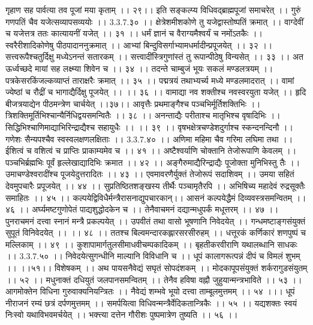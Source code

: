 गृहाण सह पार्वत्या तव पूजां मया कृताम् ।। २९।।
इति सङ्कल्प्य विधिवद्ब्राह्मपूजां समाचरेत् ।।
गुरुं गणपतिं चैव यजेत्सव्यापसव्ययोः ।। 3.3.7.३० ।।
क्षेत्रेशमीशकोणे तु यजेद्वास्तोष्पतिं क्रमात् ।।
वाग्देवीं च यजेत्तत्र ततः कात्यायनीं यजेत् ।। ३१ ।।
धर्मं ज्ञानं च वैराग्यमैश्वर्यं च नमोंऽतकैः ।।
स्वरैरीशादिकोणेषु पीठपादाननुक्रमात् ।।
आभ्यां बिन्दुविसर्गाभ्यामधर्मादीन्प्रपूजयेत् ।। ३२ ।।
सत्त्वरूपैश्चतुर्दिक्षु मध्येऽनन्तं सतारकम् ।।
सत्त्वादींस्त्रिगुणांस्तं तु रूपान्पीठेषु विन्यसेत् ।। ३३ ।।
अत ऊर्ध्वच्छदे मायां सह लक्ष्म्या शिवेन च ।। ३४ ।।
तदन्ते चाम्बुजं भूयः सकलं मण्डलत्रयम् ।।
पत्रकेसरकिंजल्कव्याप्तं ताराक्षरैः क्रमात् ।। ३५ ।।
पद्मत्रयं तथाभ्यर्च्य मध्ये मण्डलमादरात् ।।
वामां ज्येष्ठां च रौद्रीं च भागाद्यैर्दिक्षु पूजयेत् ।। ।। ३६ ।।
वामाद्या नव शक्तीश्च नवस्वरयुता यजेत् ।।
हृदि बीजत्रयाद्येन पीठमन्त्रेण चार्चयेत् ।।३७।।
आवृत्तैः प्रथमाङ्गैश्च पञ्चभिर्मूर्तिशक्तिभिः ।।
त्रिशक्तिमूर्तिभिश्चान्यैर्निधिद्वयसमन्वितैः ।। ३८ ।।
अनन्ताद्यैः परीताश्च मातृभिश्च वृषादिभिः ।।
सिद्धिभिश्चाणिमाद्याभिरिन्द्राद्यैश्च सहायुधैः ।। ।। ३९ ।।
वृषभक्षेत्रचण्डेशदुर्गाश्च स्कन्दनन्दिनौ ।।
गणेशः सैन्यपश्चैव स्वस्वलक्षणलक्षिताः ।। 3.3.7.४० ।।
अणिमा महिमा चैव गरिमा लघिमा तथा ।।
ईशित्वं च वशित्वं च प्राप्तिः प्राकाम्यमेव च ।। ४१ ।।
अष्टैश्वर्याणि चोक्तानि तेजोरूपाणि केवलम् ।।
पञ्चभिर्ब्रह्मभिः पूर्वं हृल्लेखाद्यादिभिः क्रमात ।। ४२ ।।
अङ्गैरुमाद्यैरिन्द्राद्यैः पूजोक्ता मुनिभिस्तु तैः ।।
उमाचण्डेश्वरादींश्च पूजयेदुत्तरादितः ।। ४३ ।।
एवमावरणैर्युक्तं तेजोरूपं सदाशिवम् ।।
उमया सहितं देवमुपचारैः प्रपूजयेत् ।। ४४ ।।
सुप्रतिष्ठितशङ्खस्य तीर्थैः पञ्चामृतैरपि ।।
अभिषिच्य महादेवं रुद्रसूक्तैः समाहितः ।। ४५ ।।
कल्पयेद्विविधैर्मन्त्रैरासनाद्युपचारकान्।।
आसनं कल्पयेद्धैमं दिव्यवस्त्रसमन्वितम् ।। ४६ ।।
अर्घ्यमष्टगुणोपेतं पाद्यशुद्धोदकेन च ।।
तेनैवाचमनं दद्यान्मधुपर्कं मधूत्तरम् ।। ४७ ।।
पुनराचमनं दत्त्वा स्नानं मन्त्रै प्रकल्पयेत् ।।
उपवीतं तथा वासो भूषणानि निवेदयेत् ।।
गन्धमष्टाङ्गसंयुक्तं सुपूतं विनिवेदयेत् ।। ।। ४८ ।।
ततश्च बिल्वमन्दारकह्लारसरसीरुहम् ।।
धत्तूरकं कर्णिकारं शणपुष्पं च मल्लिकाम् ।। ४९ ।।
कुशापामार्गतुलसीमाधवीचम्पकादिकम् ।।
बृहतीकरवीराणि यथालब्धानि साधकः ।। 3.3.7.५० ।।
निवेदयेत्सुगन्धीनि माल्यानि विविधानि च ।।
धूपं कालागरूत्पन्नं दीपं च विमलं शुभम् ।। ।।५१।।
विशेषकम् ।।
अथ पायसनैवेद्यं सघृतं सोपदंशकम् ।।
मोदकापूपसंयुक्तं शर्करागुडसंयुतम् ।। ५२ ।।
मधुनाक्तं दधियुतं जलपानसमन्वितम् ।।
तेनैव हविषा वह्नौ जुहुयान्मन्त्रभाविते ।। ५३ ।।
आगमोक्तेन विधिना गुरुवाक्यनियन्त्रितः ।।
नैवेद्यं शम्भवे भूयो दत्त्वा ताम्बूलमुत्तमम् ।। ५४ ।।।
धूपं नीराजनं रम्यं छत्रं दर्पणमुत्तमम् ।।
समर्पयित्वा विधिवन्मन्त्रैर्वेदिकतान्त्रिकैः ।। ५५ ।।
यद्यशक्तः स्वयं निःस्वो यथाविभवमर्चयेत् ।।
भक्त्त्या दत्तेन गौरीशः पुष्पमात्रेण तुष्यति ।। ५६ ।।
